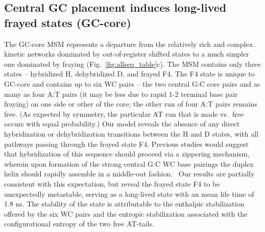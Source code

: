 \documentclass[journal=jpcbfk,manuscript=article]{achemso}
\begin{document}
\subsection{Central GC placement induces long-lived frayed states (GC-core)} \label{sec:GC-core}

The GC-core MSM represents a departure from the relatively rich and complex kinetic networks dominated by out-of-register shifted states to a much simpler one dominated by fraying (Fig.~\ref{fig:allseq_table}c). The MSM contains only three states -- hybridized H, dehybridized D, and frayed F4. The F4 state is unique to GC-core and contains up to six WC pairs -- the two central G:C core pairs and as many as four A:T pairs (it may be less due to rapid 1-2 terminal base pair fraying) on one side or other of the core; the other run of four A:T pairs remains free. (As expected by symmetry, the particular AT run that is made vs.\ free occurs with equal probability.) Our model reveals the absence of any direct hybridization or dehybridization transitions between the H and D states, with all pathways passing through the frayed state F4. Previous studies would suggest that hybridization of this sequence should proceed via a zippering mechanism, wherein upon formation of the strong central G:C WC base pairings the duplex helix should rapidly assemble in a middle-out fashion.~\citep{Romano2013DNADependence, Yin2011KineticsHybridization} Our results are partially consistent with this expectation, but reveal the frayed state F4 to be unexpectedly metastable, serving as a long-lived state with an mean life time of 1.8 ns. The stability of the state is attributable to the enthalpic stabilization offered by the six WC pairs and the entropic stabilization associated with the configurational entropy of the two free AT-tails.
\end{document}
